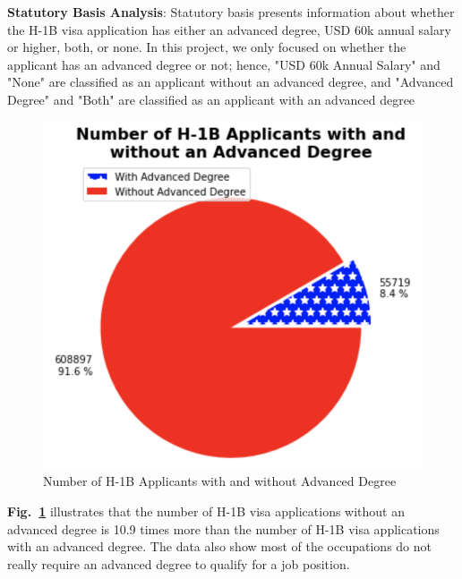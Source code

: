 \documentclass[conference]{IEEEtran}
\begin{document}
\textbf{Statutory Basis Analysis}: Statutory basis presents information about whether the H-1B visa application has either an advanced degree, USD 60k annual salary or higher, both, or none. In this project, we only focused on whether the applicant has an advanced degree or not; hence, "USD 60k Annual Salary" and "None" are classified as an applicant without an advanced degree, and "Advanced Degree" and "Both" are classified as an applicant with an advanced degree

\begin{figure}[htbp]
\centerline{\includegraphics[scale = 0.35]{ADV_Deg.png}}
\caption{Number of H-1B Applicants with and without Advanced Degree}
\label{fig_adv_nadv_1}
\end{figure}

\textbf{Fig.~\ref{fig_adv_nadv_1}} illustrates that the number of H-1B visa applications without an advanced degree is 10.9 times more than the number of H-1B visa applications with an advanced degree. The data also show most of the occupations do not really require an advanced degree to qualify for a job position. 
\end{document}
